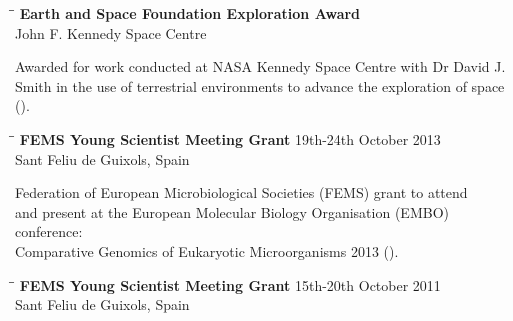 \documentclass{res}
\begin{document}
\begin{resume}
   \vspace{-0.1in}  
 
  \newpage 
   
   \begin{tabbing}
   \hspace{2in}\= \hspace{2.6in}\= \kill 
    {\bf Earth and Space Foundation Exploration Award} \> \\
                            \> 
                            \> John F. Kennedy Space Centre\\


   \end{tabbing}\vspace{-30pt}     
   Awarded for work conducted at NASA Kennedy Space Centre with Dr David J. \\ Smith in the use of terrestrial environments to advance the exploration of space ().

   \vspace{-0.1in}  
   
   \begin{tabbing}
   \hspace{2in}\= \hspace{2.6in}\= \kill 
    {\bf FEMS Young Scientist Meeting Grant} \> \> 19th-24th October 2013\\
                            \>  
                            \> Sant Feliu de Guixols, Spain \\
                       
   \end{tabbing}\vspace{-30pt}      

   Federation of European Microbiological Societies (FEMS) grant to attend\\ and present at the European Molecular Biology Organisation (EMBO) conference:\\ Comparative Genomics of Eukaryotic Microorganisms 2013 ().

 
 \vspace{-0.1in}  
   \begin{tabbing}
   \hspace{2in}\= \hspace{2.6in}\= \kill 
    {\bf FEMS Young Scientist Meeting Grant} \> \> 15th-20th October 2011\\
                            \>  
                            \> Sant Feliu de Guixols, Spain \\
                       

\end{tabbing}
\end{resume}
\end{document}
